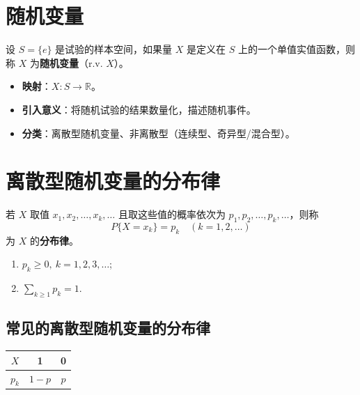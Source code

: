 \section{随机变量}
\begin{definition}[随机变量]
设 $S = \{e\}$ 是试验的样本空间，如果量 $X$ 是定义在 $S$ 上的一个单值实值函数，则称 $X$ 为\textbf{随机变量}（r.v. $X$）。
\begin{itemize}
	\item \textbf{映射}：$X: S \to \mathbb{R}$。
	\item \textbf{引入意义}：将随机试验的结果数量化，描述随机事件。
	\item \textbf{分类}：离散型随机变量、非离散型（连续型、奇异型/混合型）。
\end{itemize}
\end{definition}

\section{离散型随机变量的分布律}
\begin{definition}[分布律]
若 $X$ 取值 $x_1, x_2, \ldots, x_k, \ldots$ 且取这些值的概率依次为 $p_1, p_2, \ldots, p_k, \ldots$，则称
\begin{equation}
	P\{X = x_k\} = p_k \quad (k = 1, 2, \ldots)
	\label{eq:第二章:分布律}
\end{equation}
为 $X$ 的\textbf{分布律}。
\end{definition}

\begin{property}[分布律的性质]
\begin{enumerate}
	\item $p_k \ge 0, \ k = 1, 2, 3, \dots$;
	\item $\sum_{k \ge 1} p_k = 1$.
\end{enumerate}
\end{property}

\subsection{常见的离散型随机变量的分布律}
\begin{definition}[两点分布]
\begin{center}
\begin{tabular}{c|cc}
\toprule
$X$ & 1 & 0 \\
\midrule
$p_k$ & $1-p$ & $p$ \\
\bottomrule
\end{tabular}
\end{center}
\end{definition}

